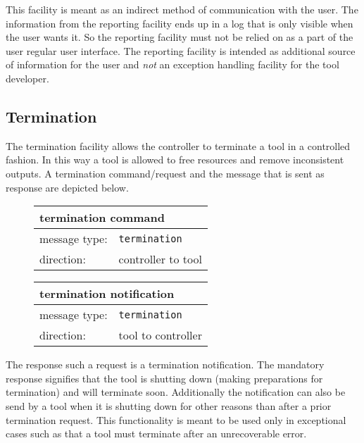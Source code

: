\documentclass{article}
\newcommand{\msg}[1]{\texttt{#1}}
\begin{document}
   \noindent This facility is meant as an indirect method of communication with
   the user. The information from the reporting facility ends up in a log that
   is only visible when the user wants it. So the reporting facility must not
   be relied on as a part of the user regular user interface.  The reporting
   facility is intended as additional source of information for the user and
   \emph{not} an exception handling facility for the tool developer.

  \subsection{Termination}

   The termination facility allows the controller to terminate a tool in a
   controlled fashion.  In this way a tool is allowed to free resources
   and remove inconsistent outputs. A termination command/request and the
   message that is sent as response are depicted below.

   \begin{figure}[H]
    \begin{center}
     \begin{tabular}{|ll|}
      \hline
       \multicolumn{2}{|l|}{\textbf{termination command}} \\
      \hline
       message type:    & \msg{termination} \\
      \hline
       direction:       & controller to tool \\
      \hline
     \end{tabular}
     \begin{tabular}{|ll|}
      \hline
       \multicolumn{2}{|l|}{\textbf{termination notification}} \\
      \hline
       message type:   & \msg{termination} \\
      \hline
       direction:      & tool to controller \\
      \hline
     \end{tabular}
    \end{center}
   \end{figure}
   \vspace{-0.5cm}

   \noindent The response such a request is a termination notification.  The
   mandatory response signifies that the tool is shutting down (making
   preparations for termination) and will terminate soon.  Additionally the
   notification can also be send by a tool when it is shutting down for other
   reasons than after a prior termination request. This functionality is meant
   to be used only in exceptional cases such as that a tool must terminate
   after an unrecoverable error.
\end{document}
